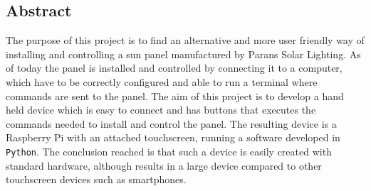 \documentclass[a4paper]{article}
\begin{document}
    \subsection*{Abstract} %
    \label{sub:abstract}
            The purpose of this project is to find an alternative and more 
            user friendly way of installing and controlling a sun panel 
            manufactured by Parans Solar Lighting. As of today the panel is 
            installed and controlled by connecting it to a computer, 
            which have to be correctly configured and able to run a terminal 
            where commands are sent to the panel. The aim of this project is 
            to develop a hand held device which is easy to connect and has 
            buttons that executes the commands needed to install and control 
            the panel. The resulting device is a Raspberry Pi with an attached
            touchscreen, running a software developed in \texttt{Python}.  
            The conclusion reached is that such a device is easily 
            created with standard hardware, although results in a large device 
            compared to other touchscreen devices such as smartphones.
            
\end{document}
